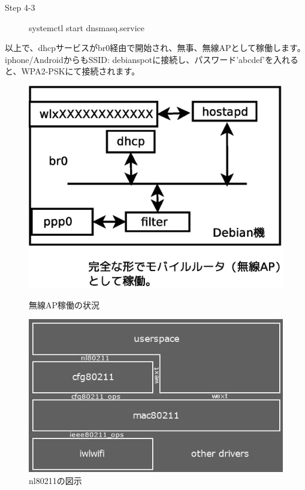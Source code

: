 \documentclass[mingoth,a4paper]{jsarticle}
\begin{document}
  \begin{description}
  \item [Step 4-3] systemctl start dnsmasq.service
  \end{description}      

  以上で、dhcpサービスがbr0経由で開始され、無事、無線APとして稼働します。iphone/AndroidからもSSID: debianspotに接続し、パスワード'abcdef'を入れると、WPA2-PSKにて接続されます。
  

\begin{figure}[htbp]
 \begin{minipage}{0.5\hsize}
\includegraphics[width=0.9\hsize]{image201512/dhcp.eps}
\caption{無線AP稼働の状況}
 \end{minipage}
 \begin{minipage}{0.5\hsize}
\includegraphics[width=0.9\hsize]{image201512/mac80211_arch_mono.jpg}
\caption{nl80211の図示}
 \end{minipage}
\end{figure}
\end{document}
